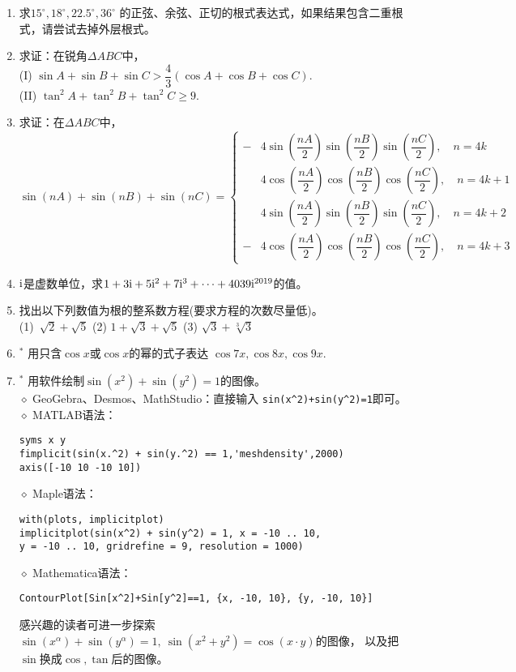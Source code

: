 \begin{enumerate}[label={\textbf{\arabic*.}},leftmargin=
    \inteval{\myenumleftmargin}pt]
\item 求$ 15^{\circ},18^{\circ},22.5^{\circ},36^{\circ} $
的正弦、余弦、正切的根式表达式，如果结果包含二重根式，请尝试去掉外层根式。


\item 求证：在锐角$ \Delta ABC $中，\\
(I) $ \sin A +\sin B +\sin C > \dfrac{4}{3} (\cos A +\cos B +\cos C) $. \\
(II) $ \tan^2 A+\tan^2 B +\tan^2 C \geq 9 $.


\item 求证：在$ \Delta ABC $中，\\ $ \sin (nA) +\sin (nB) +\sin (nC)=
\left\{
\begin{aligned}
    -& 4\sin(\dfrac{nA}{2})\sin(\dfrac{nB}{2})\sin(\dfrac{nC}{2}),\quad 
    n=4k \\
    & 4\cos(\dfrac{nA}{2})\cos(\dfrac{nB}{2})\cos(\dfrac{nC}{2}),\quad 
    n=4k+1 \\
    & 4\sin(\dfrac{nA}{2})\sin(\dfrac{nB}{2})\sin(\dfrac{nC}{2}),\quad 
    n=4k+2 \\
    -& 4\cos(\dfrac{nA}{2})\cos(\dfrac{nB}{2})\cos(\dfrac{nC}{2}),\quad 
    n=4k+3
\end{aligned} \right. $

\item $ \mathrm{i} $是虚数单位，求$ 1+3\mathrm{i}+5\mathrm{i}^2+7\mathrm{i}^3+\cdots +4039\mathrm{i}^{2019} $的值。


\item 找出以下列数值为根的整系数方程(要求方程的次数尽量低)。\\
(1)\ $ \sqrt{2}+\sqrt{5} $ \quad (2) $ 1+\sqrt{3}+\sqrt{5} $ \quad (3) 
$ \sqrt{3}+\sqrt[3]{3} $ 

\item$^*$  用只含$ \cos x $或$ \cos x $的幂的式子表达
$ \cos 7x,\cos 8x,\cos 9x $. 

\item$ ^* $ 用软件绘制$ \sin(x^2)+\sin(y^2)=1 $的图像。\\
$\diamond$ GeoGebra、Desmos、MathStudio：直接输入
\verb|sin(x^2)+sin(y^2)=1|即可。\\
$\diamond$ MATLAB语法：
\begin{lstlisting}
syms x y
fimplicit(sin(x.^2) + sin(y.^2) == 1,'meshdensity',2000)
axis([-10 10 -10 10])    
\end{lstlisting} 
$\diamond$ Maple语法：
\begin{lstlisting}
with(plots, implicitplot)
implicitplot(sin(x^2) + sin(y^2) = 1, x = -10 .. 10, 
y = -10 .. 10, gridrefine = 9, resolution = 1000)    
\end{lstlisting} 
$\diamond$ Mathematica语法：
\begin{lstlisting}
ContourPlot[Sin[x^2]+Sin[y^2]==1, {x, -10, 10}, {y, -10, 10}]    
\end{lstlisting} 

感兴趣的读者可进一步探索$ \sin(x^{\alpha})+\sin(y^{\alpha})=1,\ 
\sin\left(x^{2}+y^{2}\right)=\cos\left(x\cdot y\right) $的图像，
以及把$ \sin $换成$ \cos,\tan $后的图像。

\end{enumerate}

